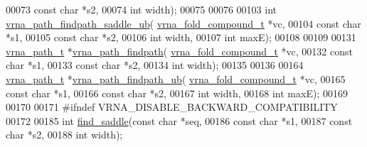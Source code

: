 \begin{DoxyCode}
00073                               \textcolor{keyword}{const} \textcolor{keywordtype}{char}            *s2,
00074                               \textcolor{keywordtype}{int}                   width);
00075 
00076 
00103 \textcolor{keywordtype}{int} \hyperlink{group__direct__paths_gada8d722e37401b1aea30128b07555771}{vrna\_path\_findpath\_saddle\_ub}(
      \hyperlink{group__fold__compound_structvrna__fc__s}{vrna\_fold\_compound\_t} *vc,
00104                                  \textcolor{keyword}{const} \textcolor{keywordtype}{char}           *s1,
00105                                  \textcolor{keyword}{const} \textcolor{keywordtype}{char}           *s2,
00106                                  \textcolor{keywordtype}{int}                  width,
00107                                  \textcolor{keywordtype}{int}                  maxE);
00108 
00109 
00131 \hyperlink{group__direct__paths_structvrna__path__s}{vrna\_path\_t} *\hyperlink{group__direct__paths_ga4b2283c4142cafd99678495585fcc842}{vrna\_path\_findpath}(
      \hyperlink{group__fold__compound_structvrna__fc__s}{vrna\_fold\_compound\_t}  *vc,
00132                                 \textcolor{keyword}{const} \textcolor{keywordtype}{char}            *s1,
00133                                 \textcolor{keyword}{const} \textcolor{keywordtype}{char}            *s2,
00134                                 \textcolor{keywordtype}{int}                   width);
00135 
00136 
00164 \hyperlink{group__direct__paths_structvrna__path__s}{vrna\_path\_t} *\hyperlink{group__direct__paths_ga8d47812616303f40057dfb033869863a}{vrna\_path\_findpath\_ub}(
      \hyperlink{group__fold__compound_structvrna__fc__s}{vrna\_fold\_compound\_t} *vc,
00165                                    \textcolor{keyword}{const} \textcolor{keywordtype}{char}           *s1,
00166                                    \textcolor{keyword}{const} \textcolor{keywordtype}{char}           *s2,
00167                                    \textcolor{keywordtype}{int}                  width,
00168                                    \textcolor{keywordtype}{int}                  maxE);
00169 
00170 
00171 \textcolor{preprocessor}{#ifndef VRNA\_DISABLE\_BACKWARD\_COMPATIBILITY}
00172 
00185 \textcolor{keywordtype}{int} \hyperlink{group__direct__paths_ga4c0dabf032c04eeab9c7370d15db6ad2}{find\_saddle}(\textcolor{keyword}{const} \textcolor{keywordtype}{char}  *seq,
00186                 \textcolor{keyword}{const} \textcolor{keywordtype}{char}  *s1,
00187                 \textcolor{keyword}{const} \textcolor{keywordtype}{char}  *s2,
00188                 \textcolor{keywordtype}{int}         width);

\end{DoxyCode}
